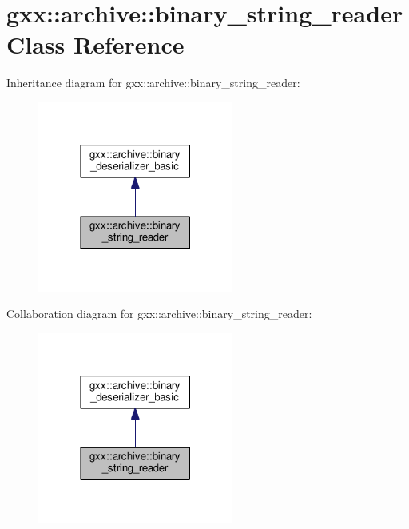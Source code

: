 \hypertarget{classgxx_1_1archive_1_1binary__string__reader}{}\section{gxx\+:\+:archive\+:\+:binary\+\_\+string\+\_\+reader Class Reference}
\label{classgxx_1_1archive_1_1binary__string__reader}


Inheritance diagram for gxx\+:\+:archive\+:\+:binary\+\_\+string\+\_\+reader\+:
\nopagebreak
\begin{figure}[H]
\begin{center}
\leavevmode
\includegraphics[width=182pt]{classgxx_1_1archive_1_1binary__string__reader__inherit__graph}
\end{center}
\end{figure}


Collaboration diagram for gxx\+:\+:archive\+:\+:binary\+\_\+string\+\_\+reader\+:
\nopagebreak
\begin{figure}[H]
\begin{center}
\leavevmode
\includegraphics[width=182pt]{classgxx_1_1archive_1_1binary__string__reader__coll__graph}
\end{center}
\end{figure}
